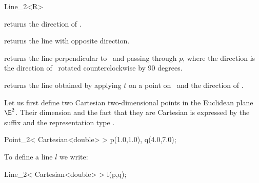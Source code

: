 \begin{ccRefClass} {Line_2<R>}
       {}
\ccGlue
{}
       {}
\ccGlue
{}
       {}


       {returns the direction of \ccVar.}

       {returns the line with opposite direction.}

        {returns the line perpendicular to \ccVar\ and passing through $p$,
         where the direction is the direction of \ccVar\ rotated 
         counterclockwise by 90 degrees.}

       {returns the line obtained by applying $t$ on a point on \ccVar\ 
        and the direction of \ccVar.}



\ccExample
Let us first define two Cartesian two-dimensional points in the Euclidean 
plane $\E^2$. Their
dimension and the fact that they are Cartesian is expressed by
the suffix  and the representation type .

\begin{cprog}

  Point_2< Cartesian<double> >  p(1.0,1.0), q(4.0,7.0);
\end{cprog} 

To define a line $l$ we write:

\begin{cprog}

  Line_2< Cartesian<double> > l(p,q);
\end{cprog} 

\ccSeeAlso
{} \\

\end{ccRefClass} 
